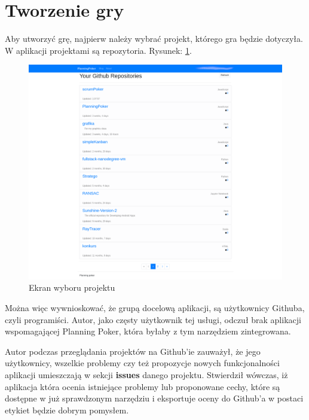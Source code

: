 \section{Tworzenie gry}

Aby utworzyć grę, najpierw należy wybrać projekt, którego gra będzie dotyczyła.
W aplikacji projektami są repozytoria. Rysunek: \ref{rys:projekty}.

\begin{figure}
	\centering\includegraphics[width=.7\textwidth]{img/repositories}
	\caption{Ekran wyboru projektu}\label{rys:projekty}%
\end{figure}

Można więc wywnioskować, że grupą docelową aplikacji, są użytkownicy Githuba, czyli programiści.
Autor, jako częsty użytkownik tej usługi, odczuł brak aplikacji wspomagającej Planning Poker,
która byłaby z tym narzędziem zintegrowana.

Autor podczas przeglądania projektów na Github'ie zauważył, że jego użytkownicy,
wszelkie problemy czy też propozycje nowych funkcjonalności aplikacji umieszczają
w sekcji \textbf{issues} danego projektu. Stwierdził wówczas, iż aplikacja która ocenia
istniejące problemy lub proponowane cechy, które są dostępne w już sprawdzonym narzędziu
i eksportuje oceny do Github'a w postaci etykiet będzie dobrym pomysłem.

